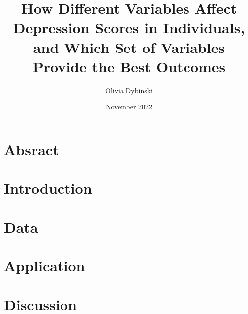 \documentclass[12pt]{article}
\title{How Different Variables Affect Depression Scores in Individuals, and Which Set of Variables Provide the Best Outcomes}
\author{Olivia Dybinski\\}
\date{November 2022}
\begin{document}
 \maketitle


 \section{Absract} 
 \label{sec:abstract}


 \section{Introduction} 
 \label{sec:intro}


 \section{Data} 
 \label{sec:data}


 \section{Application} 
 \label{sec:app}


 \section{Discussion} 
 \label{sec:disc}




 
 {}
\end{document}
